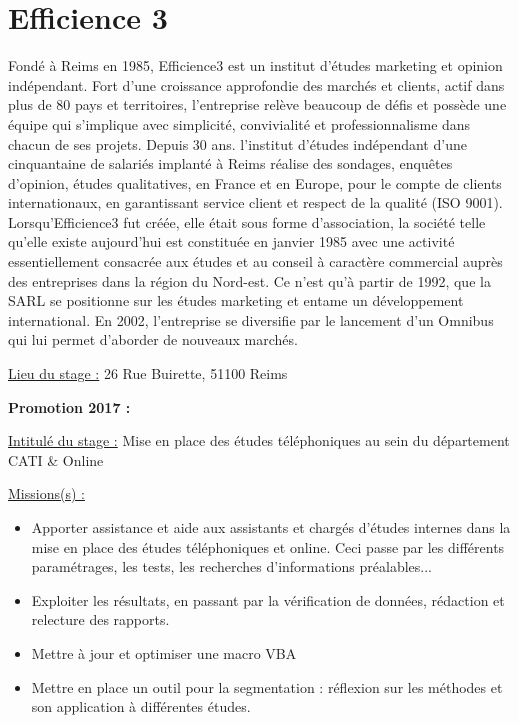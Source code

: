 \documentclass[
  letterpaper,
  DIV=11,
  numbers=noendperiod]{scrreprt}
\begin{document}
\hypertarget{efficience-3}{%
\section{\texorpdfstring{\textbf{Efficience
3}}{Efficience 3}}\label{efficience-3}}

Fondé à Reims en 1985, Efficience3 est un institut d'études marketing et
opinion indépendant. Fort d'une croissance approfondie des marchés et
clients, actif dans plus de 80 pays et territoires, l'entreprise relève
beaucoup de défis et possède une équipe qui s'implique avec simplicité,
convivialité et professionnalisme dans chacun de ses projets. Depuis 30
ans. l'institut d'études indépendant d'une cinquantaine de salariés
implanté à Reims réalise des sondages, enquêtes d'opinion, études
qualitatives, en France et en Europe, pour le compte de clients
internationaux, en garantissant service client et respect de la qualité
(ISO 9001). Lorsqu'Efficience3 fut créée, elle était sous forme
d'association, la société telle qu'elle existe aujourd'hui est
constituée en janvier 1985 avec une activité essentiellement consacrée
aux études et au conseil à caractère commercial auprès des entreprises
dans la région du Nord-est. Ce n'est qu'à partir de 1992, que la SARL se
positionne sur les études marketing et entame un développement
international. En 2002, l'entreprise se diversifie par le lancement d'un
Omnibus qui lui permet d'aborder de nouveaux marchés.

\uline{Lieu du stage :} 26 Rue Buirette, 51100 Reims

\textbf{Promotion 2017 :}

\uline{Intitulé du stage :} Mise en place des études téléphoniques au
sein du département CATI \& Online

\uline{Missions(s) :}

\begin{itemize}
\item
  Apporter assistance et aide aux assistants et chargés d'études
  internes dans la mise en place des études téléphoniques et online.
  Ceci passe par les différents paramétrages, les tests, les recherches
  d'informations préalables...
\item
  Exploiter les résultats, en passant par la vérification de données,
  rédaction et relecture des rapports.
\item
  Mettre à jour et optimiser une macro VBA
\item
  Mettre en place un outil pour la segmentation : réflexion sur les
  méthodes et son application à différentes études.
\end{itemize}
\end{document}
